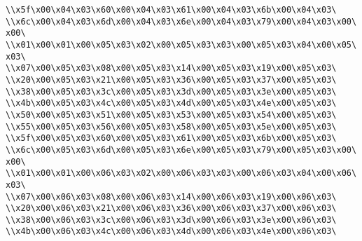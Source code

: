 \verb|\\x5f\x00\x04\x03\x60\x00\x04\x03\x61\x00\x04\x03\x6b\x00\x04\x03\|\newline
\verb|\\x6c\x00\x04\x03\x6d\x00\x04\x03\x6e\x00\x04\x03\x79\x00\x04\x03\x00\x00\|\newline
\verb|\\x01\x00\x01\x00\x05\x03\x02\x00\x05\x03\x03\x00\x05\x03\x04\x00\x05\x03\|\newline
\verb|\\x07\x00\x05\x03\x08\x00\x05\x03\x14\x00\x05\x03\x19\x00\x05\x03\|\newline
\verb|\\x20\x00\x05\x03\x21\x00\x05\x03\x36\x00\x05\x03\x37\x00\x05\x03\|\newline
\verb|\\x38\x00\x05\x03\x3c\x00\x05\x03\x3d\x00\x05\x03\x3e\x00\x05\x03\|\newline
\verb|\\x4b\x00\x05\x03\x4c\x00\x05\x03\x4d\x00\x05\x03\x4e\x00\x05\x03\|\newline
\verb|\\x50\x00\x05\x03\x51\x00\x05\x03\x53\x00\x05\x03\x54\x00\x05\x03\|\newline
\verb|\\x55\x00\x05\x03\x56\x00\x05\x03\x58\x00\x05\x03\x5e\x00\x05\x03\|\newline
\verb|\\x5f\x00\x05\x03\x60\x00\x05\x03\x61\x00\x05\x03\x6b\x00\x05\x03\|\newline
\verb|\\x6c\x00\x05\x03\x6d\x00\x05\x03\x6e\x00\x05\x03\x79\x00\x05\x03\x00\x00\|\newline
\verb|\\x01\x00\x01\x00\x06\x03\x02\x00\x06\x03\x03\x00\x06\x03\x04\x00\x06\x03\|\newline
\verb|\\x07\x00\x06\x03\x08\x00\x06\x03\x14\x00\x06\x03\x19\x00\x06\x03\|\newline
\verb|\\x20\x00\x06\x03\x21\x00\x06\x03\x36\x00\x06\x03\x37\x00\x06\x03\|\newline
\verb|\\x38\x00\x06\x03\x3c\x00\x06\x03\x3d\x00\x06\x03\x3e\x00\x06\x03\|\newline
\verb|\\x4b\x00\x06\x03\x4c\x00\x06\x03\x4d\x00\x06\x03\x4e\x00\x06\x03\|\newline
